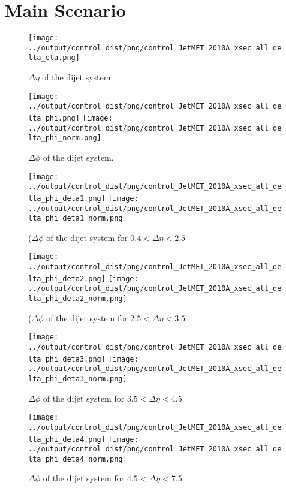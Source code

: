\documentclass[11pt]{article}
\begin{document}
\clearpage


\section{Main Scenario}

\begin{figure}[ht]
\centering
\texttt{[image: ../output/control\_dist/png/control\_JetMET\_2010A\_xsec\_all\_delta\_eta.png]}
\caption{$\Delta\eta$ of the dijet system}
\label{fig:delta_eta}
\end{figure}

\begin{figure}[ht]
\centering
\texttt{[image: ../output/control\_dist/png/control\_JetMET\_2010A\_xsec\_all\_delta\_phi.png]}
\texttt{[image: ../output/control\_dist/png/control\_JetMET\_2010A\_xsec\_all\_delta\_phi\_norm.png]}
\caption{$\Delta\phi$ of the dijet system.}
\label{fig:delta_phi}
\end{figure}

\begin{figure}[ht]
\centering
\texttt{[image: ../output/control\_dist/png/control\_JetMET\_2010A\_xsec\_all\_delta\_phi\_deta1.png]}
\texttt{[image: ../output/control\_dist/png/control\_JetMET\_2010A\_xsec\_all\_delta\_phi\_deta1\_norm.png]}
\caption{($\Delta\phi$ of the dijet system for $0.4 < \Delta\eta < 2.5$}
\label{fig:delta_deta1}
\end{figure}

\begin{figure}[ht]
\centering
\texttt{[image: ../output/control\_dist/png/control\_JetMET\_2010A\_xsec\_all\_delta\_phi\_deta2.png]}
\texttt{[image: ../output/control\_dist/png/control\_JetMET\_2010A\_xsec\_all\_delta\_phi\_deta2\_norm.png]}
\caption{($\Delta\phi$ of the dijet system for $2.5 < \Delta\eta < 3.5$}
\label{fig:delta_deta2}
\end{figure}


\begin{figure}[ht]
\centering
\texttt{[image: ../output/control\_dist/png/control\_JetMET\_2010A\_xsec\_all\_delta\_phi\_deta3.png]}
\texttt{[image: ../output/control\_dist/png/control\_JetMET\_2010A\_xsec\_all\_delta\_phi\_deta3\_norm.png]}
\caption{$\Delta\phi$ of the dijet system for  $3.5 < \Delta\eta < 4.5$}
\label{fig:delta_deta3}
\end{figure}

\begin{figure}[ht]
\centering
\texttt{[image: ../output/control\_dist/png/control\_JetMET\_2010A\_xsec\_all\_delta\_phi\_deta4.png]}
\texttt{[image: ../output/control\_dist/png/control\_JetMET\_2010A\_xsec\_all\_delta\_phi\_deta4\_norm.png]}
\caption{$\Delta\phi$ of the dijet system for $4.5 < \Delta\eta < 7.5$}
\label{fig:delta_deta4}
\end{figure}
\end{document}
